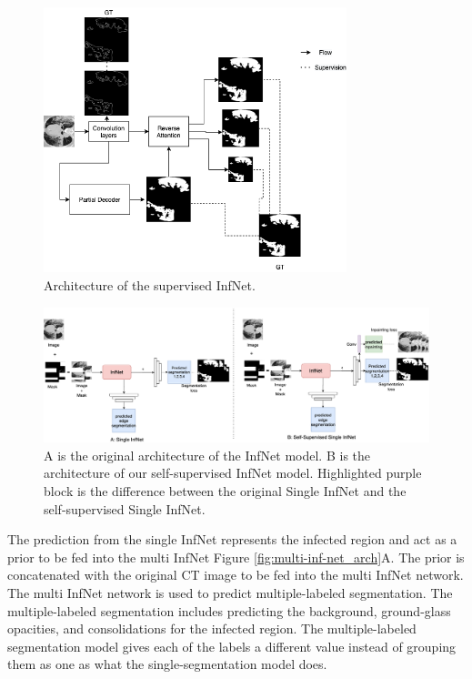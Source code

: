 \begin{figure}
	\small
	\includegraphics[width=88mm]{supervised-inf-net.png}
	\caption{Architecture of the supervised InfNet.  }
	\label{fig:supervised-inf-net_arch}
\end{figure}

\begin{figure}
	\centering
	\small
	\includegraphics[width=\linewidth]{self-super-inf-net.png}
	\caption{A is the original architecture of the InfNet model. B is the architecture of our self-supervised InfNet model. Highlighted purple block is the difference between the original Single InfNet and the self-supervised Single InfNet. }
	\label{fig:inf-net_arch}
\end{figure}

The prediction from the single InfNet represents the infected region and act as a prior to be fed into the multi InfNet Figure \ref{fig:multi-inf-net_arch}A. The prior is concatenated with the original CT image to be fed into the multi InfNet network. The multi InfNet network is used to predict multiple-labeled segmentation. The multiple-labeled segmentation includes predicting the background, ground-glass opacities, and consolidations for the infected region. The multiple-labeled segmentation model gives each of the labels a different value instead of grouping them as one as what the single-segmentation model does.

